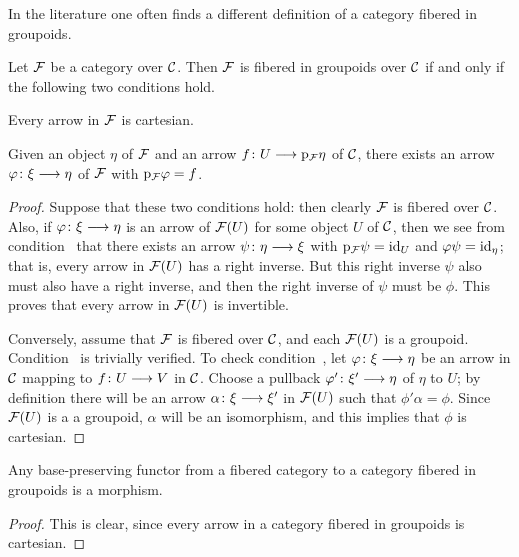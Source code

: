 \begin{3   FIBERED CATEGORIES}
\begin{3.3 Categories fibered in groupoids}
In the literature one often finds a different definition of a category fibered in groupoids.

\begin{proposition} Let $\mathcal{F}$ be a category over $\mathcal{C}$. Then $\mathcal{F}$ is fibered in groupoids over $\mathcal{C}$ if and only if the following two conditions hold.

\begin{enumeratei}
 Every arrow in $\mathcal{F}$ is cartesian.

 Given an object $\eta$ of $\mathcal{F}$ and an arrow $f \colon U \arr \p_\cF \eta$ of $\mathcal{C}$, there exists an arrow $\phi \colon \xi \arr \eta$ of $\mathcal{F}$ with $\mathrm{p}_{\mathcal{F}} \varphi = f$.
\end{enumeratei}
\end{proposition}

\begin{proof} Suppose that these two conditions hold: then clearly $\mathcal{F}$ is fibered over $\mathcal{C}$. Also, if $\phi\colon \xi \arr \eta $ is an arrow of $\mathcal{F}(U)$ for some object $U$ of $\mathcal{C}$, then we see from condition~ that there exists an arrow $\psi\colon \eta \arr \xi$ with $\mathrm{p}_{\mathcal{F}} \psi = \mathrm{id}_U$ and $\varphi\psi = \mathrm{id}_\eta$; that is, every arrow in $\mathcal{F}(U)$ has a right inverse. But this right inverse $\psi$ also must also have a right inverse, and then the right inverse of $\psi$ must be $\phi$. This proves that every arrow in $\mathcal{F}(U)$ is invertible.

Conversely, assume that $\mathcal{F}$ is fibered over $\mathcal{C}$, and each $\mathcal{F}(U)$ is a groupoid. Condition~ is trivially verified. To check condition~, let $\phi\colon \xi \arr \eta$ be an arrow in $\mathcal{C}$ mapping to $f \colon U \arr V$ in $\mathcal{C}$. Choose a pullback $\phi'\colon \xi' \arr \eta$ of $\eta$ to $U$; by definition there will be an arrow $\alpha \colon \xi \arr \xi'$ in $\mathcal{F}(U)$ such that $\phi'\alpha = \phi$. Since $\mathcal{F}(U)$ is a a groupoid, $\alpha$ will be an isomorphism, and this implies that $\phi$ is cartesian.
\end{proof}


\begin{corollary} Any base-preserving functor from a fibered category to a category fibered in groupoids is a morphism.
\end{corollary}

\begin{proof} This is clear, since every arrow in a category fibered in groupoids is cartesian.
\end{proof}


\end{3.3 Categories fibered in groupoids}
\end{3   FIBERED CATEGORIES}
